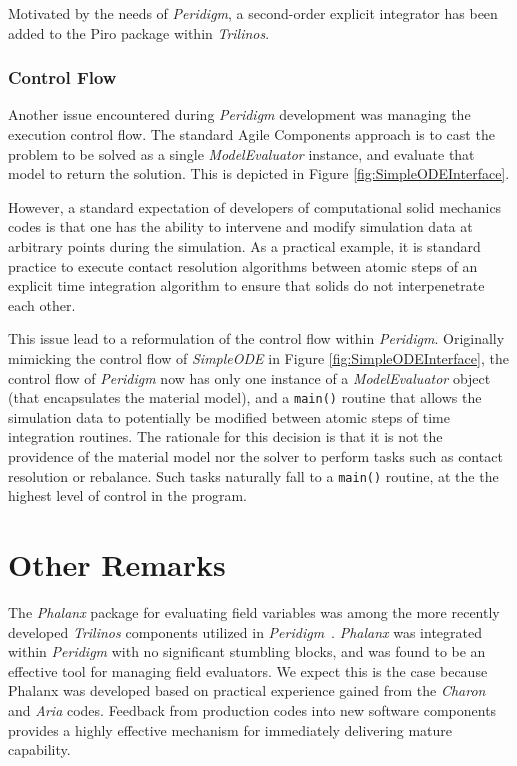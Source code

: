 \documentclass[pdf,ps2pdf,12pt,report]{SANDreport}
\theoremstyle{plain}
\theoremstyle{definition}
\theoremstyle{remark}
\numberwithin{equation}{section}
\begin{document}
Motivated by the needs of \emph{Peridigm}, a second-order explicit integrator has been added to the Piro package within \emph{Trilinos}.

\subsubsection{Control Flow}

Another issue encountered during \emph{Peridigm} development was managing the execution control flow. The standard Agile Components approach is to cast the problem to be solved as a single \emph{ModelEvaluator} instance, and evaluate that model to return the solution. This is depicted in Figure \ref{fig:SimpleODEInterface}.

However, a standard expectation of developers of computational solid mechanics codes is that one has the ability to intervene and modify simulation data at arbitrary points during the simulation. As a practical example, it is standard practice to execute contact resolution algorithms between atomic steps of an explicit time integration algorithm to ensure that solids do not interpenetrate each other.

This issue lead to a reformulation of the control flow within \emph{Peridigm}. Originally mimicking the control flow of \emph{SimpleODE} in Figure \ref{fig:SimpleODEInterface}, the control flow of \emph{Peridigm} now has only one instance of a \emph{ModelEvaluator} object (that encapsulates the material model), and a \texttt{main()} routine that allows the simulation data to potentially be modified between atomic steps of time integration routines. The rationale for this decision is that it is not the providence of the material model nor the solver to perform tasks such as contact resolution or rebalance. Such tasks naturally fall to a \texttt{main()} routine, at the the highest level of control in the program.

\section{Other Remarks}

The \emph{Phalanx} package for evaluating field variables was among the more recently developed \emph{Trilinos} components utilized in \emph{Peridigm}~\cite{PhalanxWebPage:2011}.  \emph{Phalanx} was integrated within \emph{Peridigm} with no significant stumbling blocks, and was found to be an effective tool for managing field evaluators.  We expect this is the case because Phalanx was developed based on practical experience gained from the \emph{Charon} and \emph{Aria} codes. Feedback from production codes into new software components provides a highly effective mechanism for immediately delivering mature capability.
\end{document}
